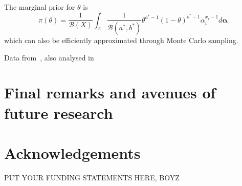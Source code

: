 \documentclass[a4paper, notitlepage, 10pt]{article}
\begin{document}
The marginal prior for $\theta$ is
\begin{equation}
\label{eq:marginalbeta}
\pi(\theta) = \frac{1}{\mathcal{B}(X)}\int_{A} \frac{1}{\mathcal{B}(a^*, b^*)} \theta^{a^* -1}(1-\theta)^{b^* -1}\alpha_i^{x_i-1}d\boldsymbol\alpha 
\end{equation}
which can also be efficiently approximated through Monte Carlo sampling.

Data from~\citep{savchuk1994}, also analysed in~\cite{rufo2012B}

\section*{Final remarks and avenues of future research}
\section*{Acknowledgements}
PUT YOUR FUNDING STATEMENTS HERE, BOYZ

\end{document}
